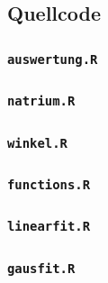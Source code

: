 \documentclass[12pt,listof=totoc]{scrartcl}
\newcommand{\code}[1]{\texttt{#1}}
\begin{document}



%


\subsection{Quellcode}
\label{sourcecode}
\subsubsection{\code{auswertung.R}}\label{auswertungR}

\subsubsection{\code{natrium.R}}\label{natriumR}

\subsubsection{\code{winkel.R}}\label{winkelR}

\subsubsection{\code{functions.R}}\label{functionsR}

\subsubsection{\code{linearfit.R}}\label{linearfitR}

\subsubsection{\code{gausfit.R}}\label{gausfitR}



\newpage
\end{document}
